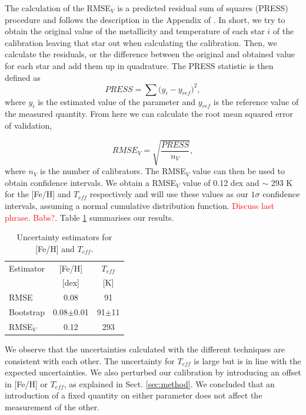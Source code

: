 \documentclass{aa}
\begin{document}
The calculation of the RMSE$_{V}$ is a predicted residual sum of squares (PRESS) procedure \citep{Weisberg-2005} and follows the description in the Appendix of \citet{Rojas-Ayala-2012}. In short, we try to obtain the original value of the metallicity and temperature of each star $i$ of the calibration leaving that star out when calculating the calibration. Then, we calculate the residuals, or the difference between the original and obtained value for each star and add them up in quadrature. The PRESS statistic is then defined as 
\begin{equation}
PRESS = \sum{(y_{i}-y_{ref}})^{2},
\end{equation}
where $y_{i}$ is the estimated value of the parameter and $y_{ref}$ is the reference value of the measured quantity. From here we can calculate the root mean squared error of validation,

\begin{equation}
RMSE_{V} = \sqrt{\frac{PRESS}{n_{V}}},
\end{equation}
where $n_{V}$ is the number of calibrators. The RMSE$_{V}$ value can then be used to obtain confidence intervals. We obtain a RMSE$_{V}$ value of 0.12 dex and $\sim$ 293 K for the [Fe/H] and $T_{eff}$ respectively and will use these values as our $1\sigma$ confidence intervals, assuming a normal cumulative distribution function. \textcolor{red}{Discuss last phrase. Babs?}. Table \ref{table:errors} summarises our results. 

\begin{table}[h!]
\centering
\caption[]{Uncertainty estimators for [Fe/H] and $T_{eff}$.}
\label{table:errors}
\begin{tabular}{l c c}
\hline
\hline
Estimator & [Fe/H] & $T_{eff}$ \\ 
                &  [dex]  &  [K] \\
\hline
RMSE & 0.08 & 91\\
Bootstrap & 0.08$\pm$0.01 & 91$\pm$11 \\
RMSE$_{V}$ & 0.12 & 293 \\
\hline
\hline
\end{tabular}
\end{table}

We observe that the uncertainties calculated with the different techniques are consistent with each other. The uncertainty for $T_{eff}$ is large but is in line with the expected uncertainties. We also perturbed our calibration by introducing an offset in [Fe/H] or $T_{eff}$, as explained in Sect. \ref{sec:method}. We concluded that an introduction of a fixed quantity on either parameter does not affect the measurement of the other.   %
\end{document}

